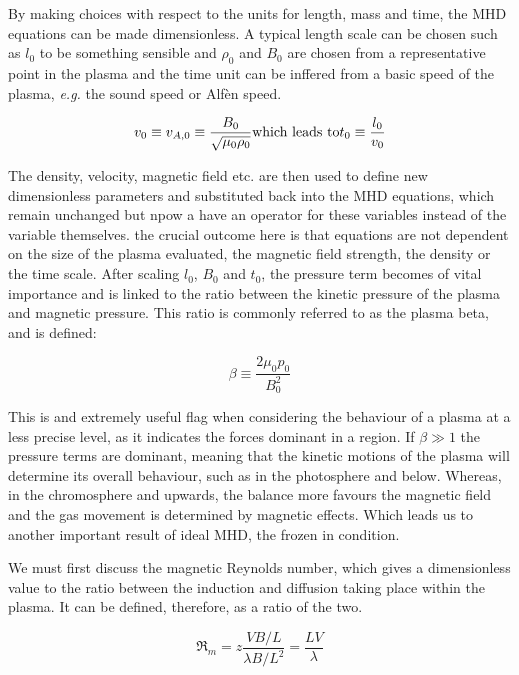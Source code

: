 By making choices with respect to the units for length, mass and time, the MHD equations can be made dimensionless.
A typical length scale can be chosen such as $l_0$ to be something sensible and $\rho_0$ and $B_0$ are chosen from a representative point in the plasma and the time unit can be inffered from a basic speed of the plasma, \emph{e.g.} the sound speed or Alf{\`e}n speed.

\begin{equation}
	v_0 \equiv v_{A,0} \equiv \frac{B_0}{\sqrt{\mu_0\rho_0}} \textnormal{which leads to} t_0 \equiv \frac{l_0}{v_0} 
\end{equation}

The density, velocity, magnetic field etc. are then used to define new dimensionless parameters and substituted back into the MHD equations, which remain unchanged but npow a have an operator for these variables instead of the variable themselves.
the crucial outcome here is that equations are not dependent on the size of the plasma evaluated, the magnetic field strength, the density or the time scale.
After scaling $l_0$, $B_0$ and $t_0$, the pressure term becomes of vital importance and is linked to the ratio between the kinetic pressure of the plasma and magnetic pressure.
This ratio is commonly referred to as the plasma beta, and is defined:

\begin{equation}
	\beta \equiv \frac{2\mu_0p_0}{B_0^2}
\end{equation} 

This is and extremely useful flag when considering the behaviour of a plasma at a less precise level, as it indicates the forces dominant in a region.
If $\beta \gg 1$ the pressure terms are dominant, meaning that the kinetic motions of the plasma will determine its overall behaviour, such as in the photosphere and below.
Whereas, in the chromosphere and upwards, the balance more favours the magnetic field and the gas movement is determined by magnetic effects.
Which leads us to another important result of ideal MHD, the frozen in condition.

We must first discuss the magnetic Reynolds number, which gives a dimensionless value to the ratio between the induction and diffusion taking place within the plasma.
It can be defined, therefore, as a ratio of the two.

\begin{equation}
	\Re_m = z\frac{VB/L}{\lambda B/L^2} = \frac{LV}{\lambda} 
\end{equation}


